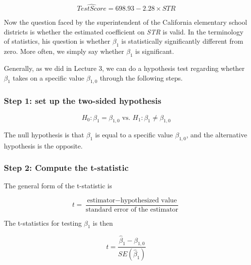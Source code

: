 \documentclass[a4paper,11pt]{article}
\begin{document}
\begin{equation}
\label{eq:testscr-str-1e}
\widehat{TestScore} = 698.93 - 2.28 \times STR
\end{equation}

Now the question faced by the superintendent of the California
elementary school districts is whether the estimated coefficient on
\emph{STR} is valid. In the terminology of statistics, his question is
whether \(\beta_1\) is statistically significantly different from
zero. More often, we simply say whether \(\beta_1\) is significant.

Generally, as we did in Lecture 3, we can do a hypothesis test
regarding whether \(\beta_1\) takes on a specific value \(\beta_{1,0}\)
through the following steps.

\subsubsection*{Step 1: set up the two-sided hypothesis}
\label{sec:org5c7ac97}

\[ H_0: \beta_1 = \beta_{1,0} \text{ vs. } H_1: \beta_1 \neq \beta_{1,0} \]

The null hypothesis is that \(\beta_1\) is equal to a specific value
\(\beta_{1,0}\), and the alternative hypothesis is the opposite.

\subsubsection*{Step 2: Compute the t-statistic}
\label{sec:orgf891068}

The general form of the t-statistic is

\begin{equation}
\label{eq:general-t}
t = \frac{\text{estimator} - \text{hypothesized value}}{\text{standard error of the estimator}}
\end{equation}

The t-statistics for testing \(\beta_1\) is then

\begin{equation}
\label{eq:t-stat-b1}
t = \frac{\hat{\beta}_1 - \beta_{1,0}}{SE(\hat{\beta}_1)}
\end{equation}
\end{document}
